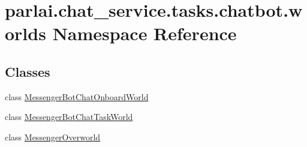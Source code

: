\hypertarget{namespaceparlai_1_1chat__service_1_1tasks_1_1chatbot_1_1worlds}{}\section{parlai.\+chat\+\_\+service.\+tasks.\+chatbot.\+worlds Namespace Reference}
\label{namespaceparlai_1_1chat__service_1_1tasks_1_1chatbot_1_1worlds}
\subsection*{Classes}
\begin{DoxyCompactItemize}
\item 
class \hyperlink{classparlai_1_1chat__service_1_1tasks_1_1chatbot_1_1worlds_1_1MessengerBotChatOnboardWorld}{Messenger\+Bot\+Chat\+Onboard\+World}
\item 
class \hyperlink{classparlai_1_1chat__service_1_1tasks_1_1chatbot_1_1worlds_1_1MessengerBotChatTaskWorld}{Messenger\+Bot\+Chat\+Task\+World}
\item 
class \hyperlink{classparlai_1_1chat__service_1_1tasks_1_1chatbot_1_1worlds_1_1MessengerOverworld}{Messenger\+Overworld}
\end{DoxyCompactItemize}
